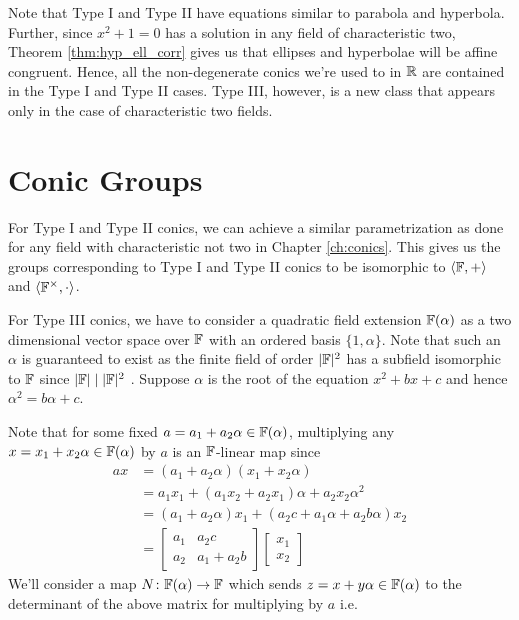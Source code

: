 \noindent
Note that Type I and Type II have equations similar to parabola and hyperbola.
Further, since $x^2 + 1 = 0$ has a solution in any field of characteristic two,
Theorem \ref{thm:hyp_ell_corr} gives us that ellipses and hyperbolae will be
affine congruent. Hence, all the non-degenerate conics we're used to in $\mathbb{R}$ are
contained in the Type I and Type II cases. Type III, however, is a new class that
appears only in the case of characteristic two fields.


\section{Conic Groups}

For Type I and Type II conics, we can achieve a similar parametrization as done
for any field with characteristic not two in Chapter \ref{ch:conics}. This gives
us the groups corresponding to Type I and Type II conics to be isomorphic to
$\langle\mathbb{F},+\rangle$ and $\langle\mathbb{F}^\times,\cdot\rangle$.
\vspace{1ex}

\noindent
For Type III conics, we have to consider a quadratic field extension $\mathbb{F}(\alpha)$
as a two dimensional vector space over $\mathbb{F}$ with an ordered basis $\{1,\alpha\}$.
Note that such an $\alpha$ is guaranteed to exist as the finite field of order
$|\mathbb{F}|^2$ has a subfield isomorphic to $\mathbb{F}$ since $|\mathbb{F}|\mid|\mathbb{F}|^2$
\cite[\S14.3]{dummit}.
Suppose $\alpha$ is the root of the equation $x^2 + bx + c$ and hence
$\alpha^2 = b\alpha+c$.

Note that for some fixed $a=a_1+a_2\alpha\in\mathbb{F}(\alpha)$, multiplying any
$x=x_1+x_2\alpha\in\mathbb{F}(\alpha)$ by $a$ is an $\mathbb{F}$-linear map since
\begin{align*}
    ax &= (a_1+a_2\alpha)(x_1+x_2\alpha) \\
       &= a_1 x_1 + (a_1 x_2 + a_2 x_1)\alpha + a_2 x_2 \alpha^2 \\
       &= (a_1 + a_2\alpha)x_1 + (a_2 c + a_1\alpha + a_2 b\alpha)x_2 \\
       &= \begin{bmatrix}a_1 & a_2 c \\ a_2 & a_1 + a_2 b\end{bmatrix}
          \begin{bmatrix}x_1 \\ x_2\end{bmatrix}
   \end{align*}
We'll consider a map $N\colon\mathbb{F}(\alpha)\to\mathbb{F}$ which sends $z=x+y\alpha\in\mathbb{F}(\alpha)$ to
the determinant of the above matrix for multiplying by $a$ i.e.

